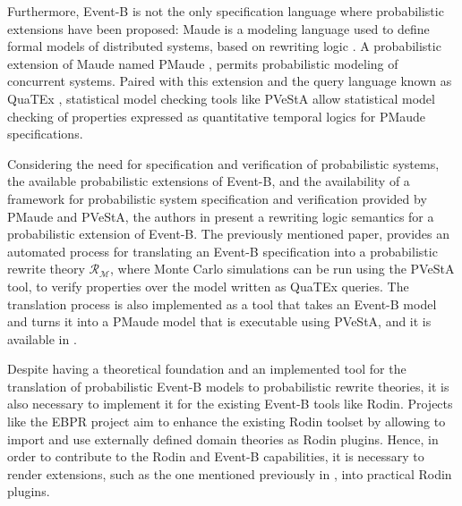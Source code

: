 Furthermore, Event-B is not the only specification language where probabilistic extensions have been proposed: Maude \cite{Clavel2007} is a modeling language used to define formal models of distributed systems, based on rewriting logic \cite{Bruni2006}. A probabilistic extension of Maude named PMaude \cite{Agha2006}, permits probabilistic modeling of concurrent systems. Paired with this extension and the query language known as QuaTEx \cite{Agha2006}, statistical model checking tools like PVeStA \cite{AlTurki2011} allow statistical model checking of properties expressed as quantitative temporal logics for PMaude specifications.

Considering the need for specification and verification of probabilistic systems, the available probabilistic extensions of Event-B, and the availability of a framework for probabilistic system specification and verification provided by PMaude and PVeStA,  the authors in \cite{Olarte} present a rewriting logic semantics for a probabilistic extension of Event-B. The previously mentioned paper, provides an automated process for translating an Event-B specification into a probabilistic rewrite theory $\mathscr{R}_\mathscr{M}$, where Monte Carlo simulations can be run using the PVeStA tool, to verify properties over the model written as QuaTEx queries. The translation process is also implemented as a tool that takes an Event-B model and turns it into a PMaude model that is executable using PVeStA, and it is available in \cite{tool.website}.

Despite having a theoretical foundation and an implemented tool for the translation of probabilistic Event-B models to probabilistic rewrite theories, it is also necessary to implement it for the existing Event-B tools like Rodin. Projects like the EBPR project \cite{EBRP} aim to enhance the existing Rodin toolset by allowing to import and use externally defined domain theories as Rodin plugins. Hence, in order to contribute to the Rodin and Event-B capabilities, it is necessary to render extensions, such as the one mentioned previously in \cite{Olarte}, into practical Rodin plugins.